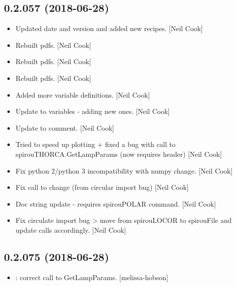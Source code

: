 \documentclass[a4paper,10pt,english]{report}
\begin{document}
\subsection{0.2.057 (2018-06-28)}
\label{\detokenize{misc/changelog:id406}}\begin{itemize}
\item {} 
Updated date and version and added new recipes. {[}Neil Cook{]}

\item {} 
Rebuilt pdfs. {[}Neil Cook{]}

\item {} 
Rebuilt pdfs. {[}Neil Cook{]}

\item {} 
Rebuilt pdfs. {[}Neil Cook{]}

\item {} 
Added more variable definitions. {[}Neil Cook{]}

\item {} 
Update to variables - adding new ones. {[}Neil Cook{]}

\item {} 
Update to comment. {[}Neil Cook{]}

\item {} 
Tried to speed up plotting + fixed a bug with call to
spirouTHORCA.GetLampParams (now requires header) {[}Neil Cook{]}

\item {} 
Fix python 2/python 3 incompatibility with numpy change. {[}Neil Cook{]}

\item {} 
Fix call to  change (from circular import bug) {[}Neil Cook{]}

\item {} 
Doc string update - requires spirouPOLAR command. {[}Neil Cook{]}

\item {} 
Fix circulate import bug \textendash{}\textgreater{} move  from spirouLOCOR to
spirouFile and update calls accordingly. {[}Neil Cook{]}

\end{itemize}


\subsection{0.2.075 (2018-06-28)}
\label{\detokenize{misc/changelog:id407}}\begin{itemize}
\item {} 
: correct call to GetLampParams. {[}melissa-hobson{]}

\end{itemize}
\end{document}
